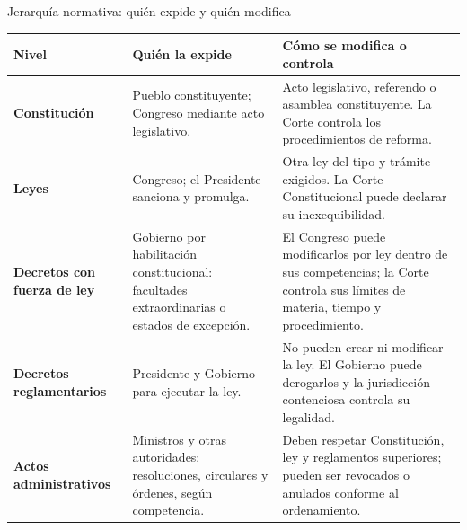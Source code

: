\documentclass{beamer}
\begin{document}
\begin{frame}{Jerarqu\'ia normativa: qui\'en expide y qui\'en modifica}
\scriptsize
\begin{tabular}{p{}p{}p{}}
\textbf{Nivel} & \textbf{Qui\'en la expide} & \textbf{C\'omo se modifica o controla} \\ \hline
\textbf{Constituci\'on} &
Pueblo constituyente; Congreso mediante acto legislativo. &
Acto legislativo, referendo o asamblea constituyente. La Corte controla los procedimientos de reforma. \\[0.16cm]
\textbf{Leyes} &
Congreso; el Presidente sanciona y promulga. &
Otra ley del tipo y tr\'amite exigidos. La Corte Constitucional puede declarar su inexequibilidad. \\[0.16cm]
\textbf{Decretos con fuerza de ley} &
Gobierno por habilitaci\'on constitucional: facultades extraordinarias o estados de excepci\'on. &
El Congreso puede modificarlos por ley dentro de sus competencias; la Corte controla sus l\'imites de materia, tiempo y procedimiento. \\[0.16cm]
\textbf{Decretos reglamentarios} &
Presidente y Gobierno para ejecutar la ley. &
No pueden crear ni modificar la ley. El Gobierno puede derogarlos y la jurisdicci\'on contenciosa controla su legalidad. \\[0.16cm]
\textbf{Actos administrativos} &
Ministros y otras autoridades: resoluciones, circulares y \'ordenes, seg\'un competencia. &
Deben respetar Constituci\'on, ley y reglamentos superiores; pueden ser revocados o anulados conforme al ordenamiento. \\
\end{tabular}
\vspace{0.12cm}
\end{frame}
\end{document}
